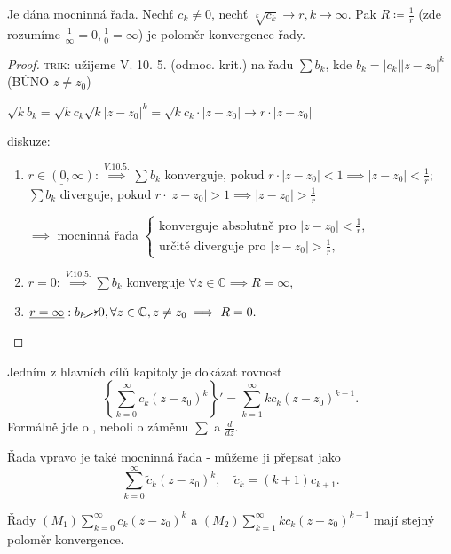 \begin{veta}
    Je dána mocninná řada. Nechť $c_k \neq 0$, nechť $\sqrt[k]{c_k}\to r, k \to \infty$. Pak $R \coloneq \frac{1}{r}$ (zde rozumíme $\frac{1}{\infty}=0, \frac{1}{0}= \infty$) je poloměr konvergence řady.
\end{veta}

\begin{proof}
  \textsc{trik}: užijeme V. 10. 5. (odmoc. krit.) na řadu $\sum b_k$, kde $b_k = |c_k||z-z_0|^k$ (BÚNO $z\neq z_0$)

  $\sqrt{k}{b_k}= \sqrt{k}{c_k} \sqrt{k}{|z-z_0|^k}=  \sqrt{k}{c_k} \cdot |z-z_0| \to r \cdot |z-z_0|$

    diskuze: \begin{enumerate}[1.]
   \item $\underline{r \in (0, \infty)}: \stackrel{V. 10. 5.}{\implies} \sum b_k$ konverguje, pokud $r\cdot|z-z_0|<1 \implies |z-z_0| < \frac{1}{r}$; $\sum b_k$ diverguje, pokud $r\cdot|z-z_0|>1 \implies |z-z_0| > \frac{1}{r}$

   $\implies$ mocninná řada $\begin{cases}
     \text{konverguje absolutně pro } |z-z_0| <\frac{1}{r},& \\\text{určitě diverguje pro } |z-z_0| >\frac{1}{r},&
     \end{cases}$
   \item $\underline{r=0}: \stackrel{V. 10. 5.}{\implies} \sum b_k$ konverguje $\forall z \in \mathbb C\implies R = \infty$,
   \item $\underline{r= \infty}: b_k \cancel{\to} 0, \forall z \in \mathbb C, z \neq z_0 \implies R = 0.$
 \end{enumerate}
\end{proof}

\begin{poznamka}
Jedním z hlavních cílů kapitoly je dokázat rovnost
\[
\left\{ \sum_{k=0}^{\infty} c_k (z - z_0)^k \right\}' = \sum_{k=1}^{\infty} k c_k (z - z_0)^{k-1}.
\]
Formálně jde o , neboli o záměnu $\sum$ a $\frac{d}{dz}$.
\end{poznamka}

Řada vpravo je také mocninná řada - můžeme ji přepsat jako
\[
\sum_{k=0}^{\infty} \tilde{c}_k (z - z_0)^k, \quad \tilde{c}_k = (k+1) c_{k+1}.
\]

\begin{lemma}
Řady $(M_1)\sum_{k=0}^{\infty}c_k(z - z_0)^k$ a $(M_2)\sum_{k=1}^{\infty}kc_k(z - z_0)^{k-1}$ mají stejný poloměr konvergence.
\end{lemma}

